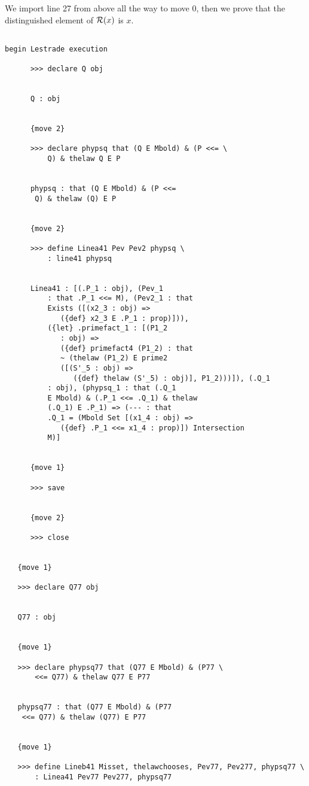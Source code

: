 \documentclass[12pt]{article}
\begin{document}
We import line 27 from above all the way to move 0, then we prove that the distinguished element of ${\cal R}(x)$ is $x$.

\begin{verbatim}

begin Lestrade execution

      >>> declare Q obj


      Q : obj


      {move 2}

      >>> declare phypsq that (Q E Mbold) & (P <<= \
          Q) & thelaw Q E P


      phypsq : that (Q E Mbold) & (P <<= 
       Q) & thelaw (Q) E P


      {move 2}

      >>> define Linea41 Pev Pev2 phypsq \
          : line41 phypsq


      Linea41 : [(.P_1 : obj), (Pev_1 
          : that .P_1 <<= M), (Pev2_1 : that 
          Exists ([(x2_3 : obj) => 
             ({def} x2_3 E .P_1 : prop)])), 
          ({let} .primefact_1 : [(P1_2 
             : obj) => 
             ({def} primefact4 (P1_2) : that 
             ~ (thelaw (P1_2) E prime2 
             ([(S'_5 : obj) => 
                ({def} thelaw (S'_5) : obj)], P1_2)))]), (.Q_1 
          : obj), (phypsq_1 : that (.Q_1 
          E Mbold) & (.P_1 <<= .Q_1) & thelaw 
          (.Q_1) E .P_1) => (--- : that 
          .Q_1 = (Mbold Set [(x1_4 : obj) => 
             ({def} .P_1 <<= x1_4 : prop)]) Intersection 
          M)]


      {move 1}

      >>> save


      {move 2}

      >>> close


   {move 1}

   >>> declare Q77 obj


   Q77 : obj


   {move 1}

   >>> declare phypsq77 that (Q77 E Mbold) & (P77 \
       <<= Q77) & thelaw Q77 E P77


   phypsq77 : that (Q77 E Mbold) & (P77 
    <<= Q77) & thelaw (Q77) E P77


   {move 1}

   >>> define Lineb41 Misset, thelawchooses, Pev77, Pev277, phypsq77 \
       : Linea41 Pev77 Pev277, phypsq77



\end{verbatim}
\end{document}
